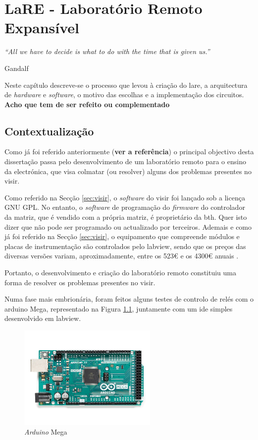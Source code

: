 \chapter{LaRE - Laboratório Remoto Expansível}
\label{Capítulo3}
\begin{center}
    \textit{``All we have to decide is what to do with the time that is given us.''}

    Gandalf
\end{center}

Neste capítulo descreve-se o processo que levou à criação do \acrshort{lare}, a arquitectura de \textit{hardware} e \textit{software}, o motivo das escolhas e a implementação dos circuitos. \textbf{Acho que tem de ser refeito ou complementado}

\section{Contextualização}
\label{sec:contextualização}
Como já foi referido anteriormente (\textbf{ver a referência}) o principal objectivo desta dissertação passa pelo desenvolvimento de um \acrshort{laboratório remoto} para o ensino da electrónica, que visa colmatar (ou resolver) alguns dos problemas presentes no \acrshort{visir}.

Como referido na Secção \ref{sec:visir}, o \textit{software} do \acrshort{visir} foi lançado sob a licença GNU GPL. No entanto, o \textit{software} de programação do \textit{firmware} do controlador da matriz, que é vendido com a própria matriz, é proprietário da \acrshort{bth}. Quer isto dizer que não pode ser programado ou actualizado por terceiros. Ademais e como já foi referido na Secção \ref{sec:visir}, o equipamento que compreende módulos e placas de instrumentação são controlados pelo \acrshort{labview}, sendo que os preços das diversas versões variam, aproximadamente, entre os 523€ e os 4300€ anuais \cite{labviewpricing}.

Portanto, o desenvolvimento e criação do \acrshort{laboratório remoto} constituiu uma forma de resolver os problemas presentes no \acrshort{visir}.

Numa fase mais embrionária, foram feitos alguns testes de controlo de relés com o \gls{arduino} Mega, representado na Figura \ref{fig:arduinomega}, juntamente com um \acrfull{ide} simples desenvolvido em \acrshort{labview}.

\begin{figure}[hbtp]
    \centering
    \includegraphics[width=0.6\textwidth]{figures/arduinomega.png}
    \caption{\textit{Arduino} Mega \cite{ArduinoMega}}
    \label{fig:arduinomega}
\end{figure}

